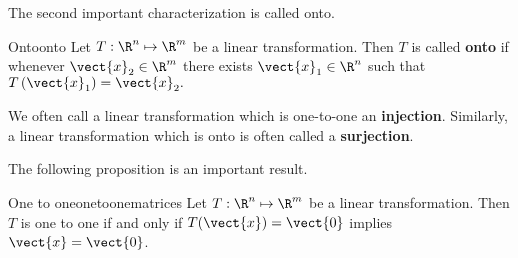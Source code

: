 The second important characterization is called onto.

\begin{definition}{Onto}{onto}
Let $T: \R^n \mapsto \R^m$ be a linear transformation. Then $T$ is called \textbf{onto} if whenever $\vect{x}_2 \in \R^{m}$ there exists 
$\vect{x}_1 \in \R^{n}$ such that $T\left( \vect{x}_1\right) = \vect{x}_2. $
\end{definition}

We often call a linear transformation which is one-to-one an \textbf{injection}. Similarly, a linear transformation which is onto is often called a \textbf{surjection}.

The following proposition is an important result. 

\begin{proposition}{One to one}{onetoonematrices}
Let $T:\R^n \mapsto \R^m$ be a linear transformation. Then $T$ is one to one if
and only if $T(\vect{x}) = \vect{0}$ implies $\vect{x}=\vect{0}$.
\end{proposition}

